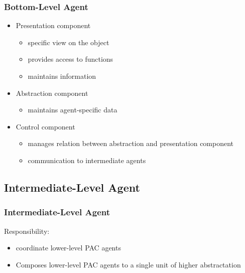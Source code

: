 \documentclass{beamer}
\begin{document}
\begin{frame}
 \frametitle{Bottom-Level Agent}
 
 \begin{itemize}

  \item Presentation component
  \begin{itemize}
   \item specific view on the object
    \item provides access to functions
    \item maintains information
  \end{itemize}
  \item Abstraction component
  \begin{itemize}
    \item maintains agent-specific data
  \end{itemize}
  \item Control component
  \begin{itemize}
   \item manages relation between abstraction and presentation component
    \item communication to intermediate agents
  \end{itemize}

 \end{itemize}


 
\end{frame}

\subsection{Intermediate-Level Agent}


\begin{frame}
 \frametitle{Intermediate-Level Agent}
 
 Responsibility:
 
 \begin{itemize}
  \item coordinate lower-level PAC agents
  \item Composes lower-level PAC agents to a single unit of higher abstractation
 \end{itemize}
 

\end{frame}
\end{document}
